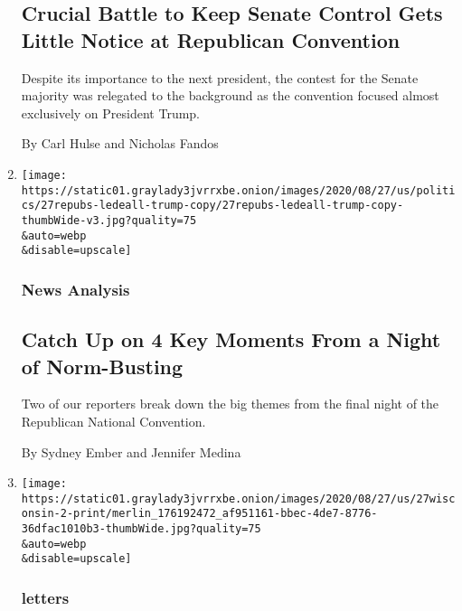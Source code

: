 \begin{enumerate}
{  \subsection{Crucial Battle to Keep Senate Control Gets Little Notice
  at Republican
  Convention}\label{crucial-battle-to-keep-senate-control-gets-little-notice-at-republican-convention}}

  Despite its importance to the next president, the contest for the
  Senate majority was relegated to the background as the convention
  focused almost exclusively on President Trump.

  By Carl Hulse and Nicholas Fandos
\item
  \href{/2020/08/28/us/politics/rnc-convention-speeches.html}{}

  \texttt{[image: https://static01.graylady3jvrrxbe.onion/images/2020/08/27/us/politics/27repubs-ledeall-trump-copy/27repubs-ledeall-trump-copy-thumbWide-v3.jpg?quality=75\\\&auto=webp\\\&disable=upscale]}

  \hypertarget{news-analysis}{%
  \subsubsection{News Analysis}\label{news-analysis}}

  \hypertarget{catch-up-on-4-key-moments-from-a-night-of-norm-busting}{%
  \subsection{Catch Up on 4 Key Moments From a Night of
  Norm-Busting}\label{catch-up-on-4-key-moments-from-a-night-of-norm-busting}}

  Two of our reporters break down the big themes from the final night of
  the Republican National Convention.

  By Sydney Ember and Jennifer Medina
\item
  \href{/2020/08/27/opinion/letters/wisconsin-violence.html}{}

  \texttt{[image: https://static01.graylady3jvrrxbe.onion/images/2020/08/27/us/27wisconsin-2-print/merlin\_176192472\_af951161-bbec-4de7-8776-36dfac1010b3-thumbWide.jpg?quality=75\\\&auto=webp\\\&disable=upscale]}

  \hypertarget{letters}{%
  \subsubsection{letters}\label{letters}}


\end{enumerate}
